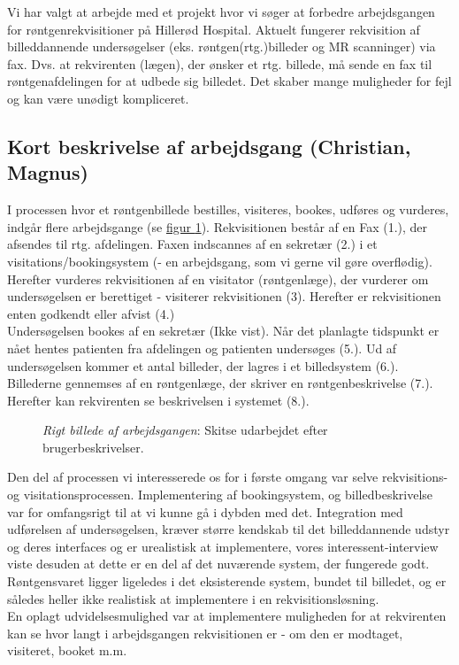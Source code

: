 Vi har valgt at arbejde med et projekt hvor vi søger at forbedre
arbejdsgangen for røntgenrekvisitioner på Hillerød Hospital. Aktuelt fungerer
rekvisition af billeddannende undersøgelser (eks. røntgen(rtg.)billeder og MR
scanninger) via fax. Dvs. at rekvirenten (lægen), der ønsker et rtg. billede, må
sende en fax til røntgenafdelingen for at udbede sig billedet. Det skaber mange
muligheder for fejl og kan være unødigt kompliceret.
\subsection*{Kort beskrivelse af arbejdsgang (Christian, Magnus)}
I processen hvor et røntgenbillede bestilles, visiteres, bookes, udføres
og vurderes, indgår flere arbejdsgange
(se \hyperref[Rigt_billede]{figur \ref*{Rigt_billede}}).
Rekvisitionen består af en Fax (1.), der afsendes til rtg. afdelingen. Faxen
indscannes af en sekretær (2.) i et visitations/bookingsystem (- en arbejdsgang,
som vi gerne vil gøre overflødig). Herefter vurderes rekvisitionen af en
visitator (røntgenlæge), der vurderer om undersøgelsen er berettiget - visiterer
rekvisitionen (3). Herefter er rekvisitionen enten godkendt eller afvist (4.)\\
\indent Undersøgelsen bookes af en sekretær (Ikke vist). Når det planlagte
tidspunkt er nået hentes patienten fra afdelingen og patienten undersøges (5.).
Ud af undersøgelsen kommer et antal billeder, der lagres i et billedsystem (6.).
Billederne gennemses af en røntgenlæge, der skriver en  røntgenbeskrivelse (7.).
Herefter kan rekvirenten se beskrivelsen i systemet (8.).
\FloatBarrier
\begin{figure}[h]
\centering
{}
\caption{\emph{Rigt billede af arbejdsgangen}: Skitse udarbejdet efter
brugerbeskrivelser.\label{Rigt_billede}}
\end{figure}
\FloatBarrier
\indent Den del af processen vi interesserede os for i første omgang var selve
rekvisitions- og visitationsprocessen. Implementering af bookingsystem, og
billedbeskrivelse var for omfangsrigt til at vi kunne gå i dybden med det.
Integration med udførelsen af undersøgelsen, kræver større kendskab til det
billeddannende udstyr og deres interfaces og er urealistisk at implementere,
vores interessent-interview viste desuden at dette er en del af det nuværende
system, der fungerede godt. Røntgensvaret ligger ligeledes i det eksisterende
system, bundet til billedet, og er således heller ikke realistisk at
implementere i en rekvisitionsløsning.\\
\indent En oplagt udvidelsesmulighed var at implementere muligheden for at
rekvirenten kan se hvor langt i arbejdsgangen rekvisitionen er - om den er
modtaget, visiteret, booket m.m.
